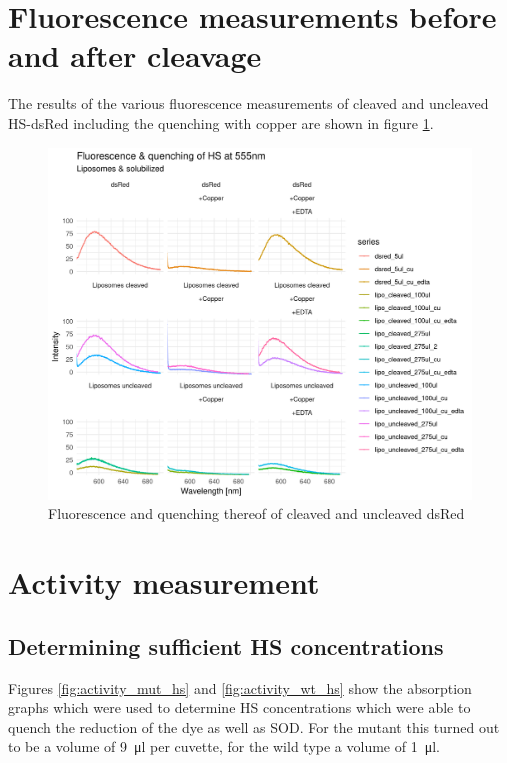 \section{Fluorescence measurements before and after cleavage}

The results of the various fluorescence measurements of cleaved and uncleaved
HS-dsRed including the quenching with copper are shown in figure
\ref{fig:dsred_cleavage_fluorescence}.

\begin{figure}
	\centering
	\includegraphics[width=\textwidth]{img/dsred_cleavage_fluorescence.png}
	\caption{Fluorescence and quenching thereof of cleaved and uncleaved dsRed}
	\label{fig:dsred_cleavage_fluorescence}
\end{figure}

\section{Activity measurement}

\subsection{Determining sufficient HS concentrations}

Figures \ref{fig:activity_mut_hs} and \ref{fig:activity_wt_hs} show the
absorption graphs which were used to determine HS concentrations which were
able to quench the reduction of the dye as well as SOD. For the mutant this
turned out to be a volume of \SI{9}{\ul} per cuvette, for the wild type a
volume of \SI{1}{\ul}.

